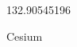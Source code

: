 \documentclass[12pt]{article}
\begin{document}
\hfill{}
\vfill
\begin{center}
  {\fontsize{50}{60}
  }

  \vspace{1em}

  132.90545196

Cesium
\end{center}
\vfill
\end{document}
